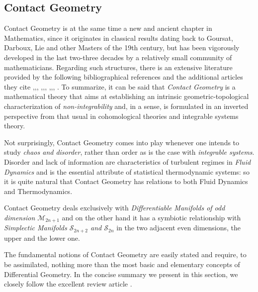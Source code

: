 \documentclass[10pt,a4paper]{article}
\begin{document}
\subsection{Contact Geometry}
\label{contattiamoci} Contact Geometry is at the same time a new and ancient chapter in Mathematics, since it originates in classical results dating back to Goursat, Darboux, Lie and other Masters of the 19th century, but has been vigorously developed in the last two-three decades by a relatively small community of mathematicians. Regarding such structures, there is an extensive literature provided by the following bibliographical references and the additional articles they cite
\cite{Gilbert},\cite{Etnyre2000},\cite{Ghrist2007},\cite{contatoregeiges}
,\cite{cardone2019},\cite{miranda2021},
\cite{trasversozero},\cite{unochiuseinteg},\cite{guglielminoconmiranda},
\cite{pollosingolare}. To summarize, it can be said that \textit{Contact Geometry} is a mathematical theory that aims at establishing an intrinsic geometric-topological characterization of \textit{non-integrability} and, in a sense, is formulated in an inverted perspective from that usual in cohomological theories and integrable systems theory.
\par
Not surprisingly, Contact Geometry comes into play whenever one intends to study \textit{chaos and disorder}, rather than order as is the case with \textit{integrable systems}. Disorder and lack of information are characteristics of turbulent regimes in \textit{Fluid Dynamics} and is the essential attribute of statistical thermodynamic systems: so it is quite natural that Contact Geometry has relations to both Fluid Dynamics and Thermodynamics.
\par
Contact Geometry deals exclusively with
\textit{Differentiable Manifolds of odd dimension
$\mathcal{M}_{2n+1}$ }  and on the other hand it has a symbiotic relationship with
 \textit{ Simplectic Manifolds  $\mathcal{S}_{2n+2}$ and
$\mathcal{S}_{2n}$} in the two adjacent even dimensions, the upper and the lower one.
\par
The fundamental notions of Contact Geometry are easily stated and require, to be assimilated, nothing more than the most basic and elementary concepts of Differential Geometry. In the concise summary we present in this section, we closely follow the excellent review article \cite{contatoregeiges}.
\end{document}
